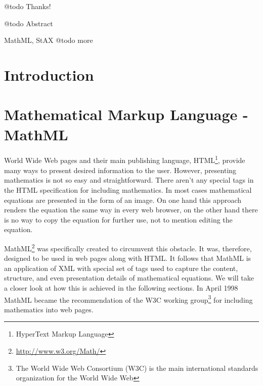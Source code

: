 \documentclass[11pt,oneside,final]{fithesis2}
\begin{document}
\sloppy




\FrontMatter
\ThesisTitlePage

\begin{ThesisDeclaration}
\DeclarationText
\AdvisorName
\end{ThesisDeclaration}

\begin{ThesisThanks}
@todo Thanks!
\end{ThesisThanks}

\begin{ThesisAbstract}
@todo Abstract
\end{ThesisAbstract}

\begin{ThesisKeyWords}
MathML, StAX  @todo more
\end{ThesisKeyWords}

\MainMatter
\tableofcontents

\chapter{Introduction}


\chapter{Mathematical Markup Language - MathML}
World Wide Web pages and their main publishing language, HTML\footnote{HyperText Markup Language}, provide many ways to present desired information to the user. However, presenting mathematics is not so easy and straightforward. There aren't any special tags in the HTML specification for including mathematics. In most cases mathematical equations are presented in the form of an image. On one hand this approach renders the equation the same way in every web browser, on the other hand there is no way to copy the equation for further use, not to mention editing the equation. 

MathML\footnote{\url{http://www.w3.org/Math/}} was specifically created to circumvent this obstacle. It was, therefore, designed to be used in web pages along with HTML. It follows that MathML is an application of XML with special set of tags used to capture the content, structure, and even presentation details of mathematical equations. We will take a closer look at how this is achieved in the following sections. In April 1998 MathML became the recommendation of the W3C working group\footnote{The World Wide Web Consortium (W3C) is the main international standards organization for the World Wide Web} for including mathematics into web pages.
\end{document}
